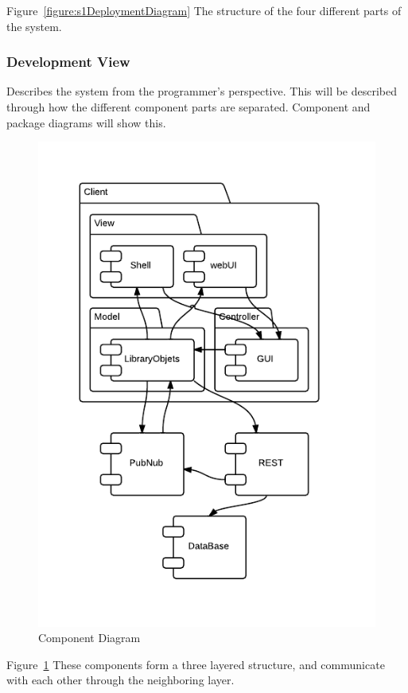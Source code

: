 Figure~\ref{figure:s1DeploymentDiagram} The structure of the four different parts of the system.

\subsubsection{Development View}
Describes the system from the programmer's perspective. This will be described through how the different component parts are separated. Component and package diagrams will show this.

\begin{figure}[h]
\centering
\includegraphics[width=5in]{image/architecture/s1/s1ComponentDiagram.png}
\caption{Component Diagram}
\label{figure:s1ComponentDiagram}
\end{figure}

Figure~\ref{figure:s1ComponentDiagram} These components form a three layered structure, and communicate with each other through the neighboring layer.


